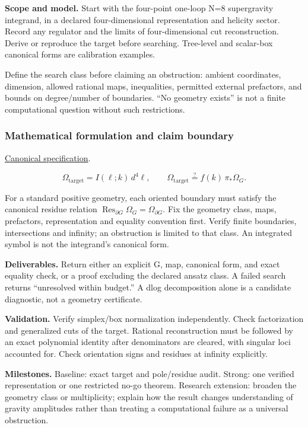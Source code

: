 \documentclass[
  11pt,
]{article}
\begin{document}
\textbf{Scope and model.} Start with the four-point one-loop N=8
supergravity integrand, in a declared four-dimensional representation
and helicity sector. Record any regulator and the limits of
four-dimensional cut reconstruction. Derive or reproduce the target
before searching. Tree-level and scalar-box canonical forms are
calibration examples.

Define the search class before claiming an obstruction: ambient
coordinates, dimension, allowed rational maps, inequalities, permitted
external prefactors, and bounds on degree/number of boundaries. ``No
geometry exists'' is not a finite computational question without such
restrictions.

\subsubsection{Mathematical formulation and claim boundary}

\href{https://github.com/rick-stevens-ai/Pure-Thought/blob/main/PRDs/05-Positive-Geometry-Gravity.md}{Canonical
specification}.

\[\Omega_{\mathrm{target}}=I(\ell;k)\,d^4\ell,
\qquad \Omega_{\mathrm{target}}\stackrel{?}{=}f(k)\,\pi_*\Omega_G.\]

For a standard positive geometry, each oriented boundary must satisfy
the canonical residue relation
\(\operatorname{Res}_{\partial G}\Omega_G=\Omega_{\partial G}\). Fix the
geometry class, maps, prefactors, representation and equality convention
first. Verify finite boundaries, intersections and infinity; an
obstruction is limited to that class. An integrated symbol is not the
integrand's canonical form.

\textbf{Deliverables.} Return either an explicit G, map, canonical form,
and exact equality check, or a proof excluding the declared ansatz
class. A failed search returns ``unresolved within budget.'' A dlog
decomposition alone is a candidate diagnostic, not a geometry
certificate.

\textbf{Validation.} Verify simplex/box normalization independently.
Check factorization and generalized cuts of the target. Rational
reconstruction must be followed by an exact polynomial identity after
denominators are cleared, with singular loci accounted for. Check
orientation signs and residues at infinity explicitly.

\textbf{Milestones.} Baseline: exact target and pole/residue audit.
Strong: one verified representation or one restricted no-go theorem.
Research extension: broaden the geometry class or multiplicity; explain
how the result changes understanding of gravity amplitudes rather than
treating a computational failure as a universal obstruction.
\end{document}

